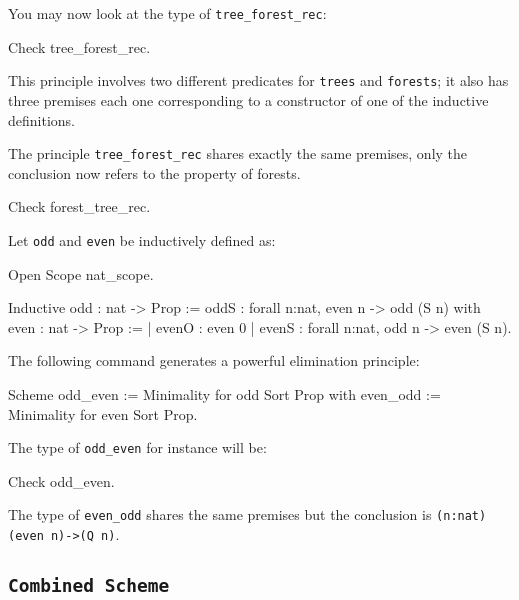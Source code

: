 \begin{coq_example*}
You may now look at the type of {\tt tree\_forest\_rec}:

\begin{coq_example}
Check tree_forest_rec.
\end{coq_example}

This principle involves two different predicates for {\tt trees} and
{\tt forests}; it also has three premises each one corresponding to a
constructor of one of the inductive definitions.

The principle {\tt tree\_forest\_rec} shares exactly the same
premises, only the conclusion now refers to the property of forests.

\begin{coq_example}
Check forest_tree_rec.
\end{coq_example}


Let {\tt odd} and {\tt even} be inductively defined as:

\begin{coq_eval}
Open Scope nat_scope.
\end{coq_eval}

\begin{coq_example*}
Inductive odd : nat -> Prop :=
    oddS : forall n:nat, even n -> odd (S n)
with even : nat -> Prop :=
  | evenO : even 0
  | evenS : forall n:nat, odd n -> even (S n).
\end{coq_example*}

The following command generates a powerful elimination
principle:

\begin{coq_example}
Scheme odd_even := Minimality for   odd Sort Prop
  with even_odd := Minimality for even Sort Prop.
\end{coq_example}

The type of {\tt odd\_even} for instance will be:

\begin{coq_example}
Check odd_even.
\end{coq_example}

The type of {\tt even\_odd} shares the same premises but the
conclusion is {\tt (n:nat)(even n)->(Q n)}.

\subsection[{\tt Combined Scheme}]{{\tt Combined Scheme}
\label{CombinedScheme-examples}}


\end{coq_example*}
